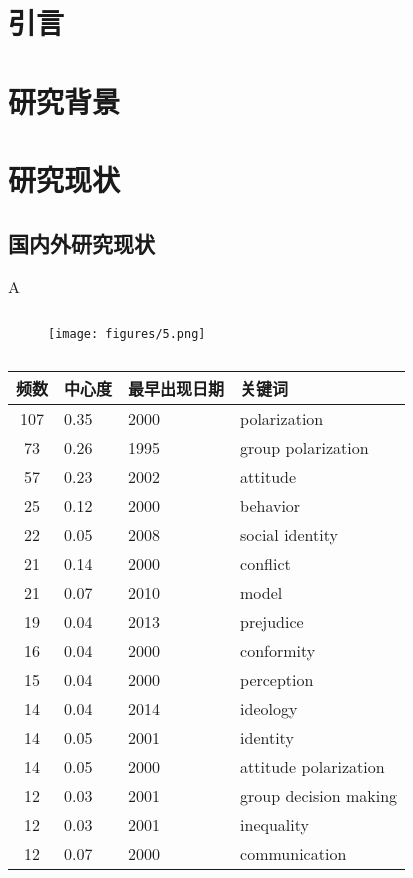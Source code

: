 \documentclass{cjc}
\begin{document}
\maketitle
\section{引言}

\section{研究背景}
\section{研究现状}
\subsection{国内外研究现状}
\begin{table}[htbp]
  \centering
  \caption{A}
  \label{tab:exampletable}
  \begin{tabular}{clll}
    \toprule
    \\
    \midrule
  \end{tabular}

\end{table}
\begin{figure}[htbp]
\centering
\texttt{[image: figures/5.png]}
\caption{}
\label{fig:logo}
\end{figure}
\begin{table}[htbp]
  \centering
  \caption{}
  \label{tab:exampletable}
  \begin{tabular}{clll}
    \toprule
    频数 & 中心度 & 最早出现日期 & 关键词 \\
    \midrule
	107  & 0.35  & 2000  &  polarization\\
	73	 & 0.26	 & 1995	 &  group polarization\\
	57	 & 0.23	 & 2002	 &  attitude\\
	25	 & 0.12	 & 2000	 &  behavior\\
	22	 & 0.05	 & 2008	 &  social identity\\
	21	 & 0.14	 & 2000	 &  conflict\\
	21	 & 0.07	 & 2010	 &  model\\
	19	 & 0.04	 & 2013	 &  prejudice\\
	16	 & 0.04	 & 2000	 &  conformity\\
	15	 & 0.04	 & 2000	 &  perception\\
	14	 & 0.04	 & 2014	 &  ideology\\
	14	 & 0.05	 & 2001	 &  identity\\
	14	 & 0.05	 & 2000	 &  attitude polarization\\
	12	 & 0.03	 & 2001	 &  group decision making\\
	12	 & 0.03	 & 2001	 &  inequality\\
	12	 & 0.07	 & 2000	 &  communication\\
    \bottomrule
  \end{tabular}
\end{table}
\end{document}

